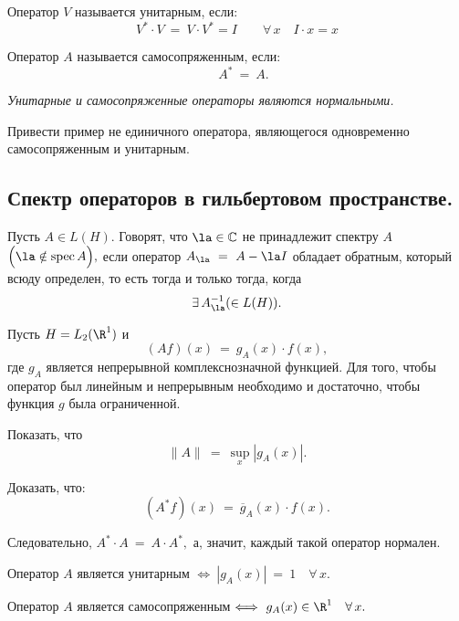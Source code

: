 \documentclass[a4paper]{article}
\newcommand{\mro} {\R^1}
\newcommand{\spec}{\mathop{\mathrm{spec}}\nolimits}
\begin{document}
\begin{df}
Оператор $V$ называется унитарным, если:
$$
V^{*} \cdot V \ = \ V \cdot V^{*} = I \qquad \forall \, x \quad I
\cdot x = x
$$
\end{df}

\begin{df}
Оператор $A$ называется самосопряженным, если:
$$
\quad A^{*}\ = \ A.$$
\end{df}
\emph{Унитарные и самосопряженные операторы являются нормальными.}

\begin{problem}
Привести пример не единичного оператора, являющегося одновременно
самосопряженным и унитарным.
\end{problem}

\subsection{Спектр операторов в гильбертовом пространстве.}

Пусть $A\in L(H).$ Говорят, что $\la\in \mathbb{C}$ не принадлежит
спектру $A$ $\Bigl(\la\notin \spec A\Bigr),$ если оператор
$A_{\la} \ = \ A - \la I$ обладает обратным, который всюду
определен, то есть тогда и только тогда, когда
$$\exists \, A_{\la}^{-1} (\in L(H)).$$

\begin{ex}
Пусть $H = L_2(\mro)$ и
$$
(Af)(x)\ = \ g_{A} (x) \cdot f(x),
$$
где $g_A$ является непрерывной комплекснозначной функцией. Для
того, чтобы оператор был линейным и непрерывным необходимо и
достаточно, чтобы функция $g$ была ограниченной.
\end{ex}

\begin{problem}
Показать, что
$$
\|A\|\ = \ \sup\limits_{x} |g_A (x)|.
$$
\end{problem}

\begin{problem}
Доказать, что:
$$
(A^{*} f)(x)\ = \ \overline{g}_{A} (x) \cdot f(x).
$$
\end{problem}

Следовательно, $A^{*} \cdot A\ = \ A \cdot A^{*},$ а, значит,
каждый такой оператор нормален.

\begin{problem}
Оператор $A$ является унитарным $\Longleftrightarrow \ |g_A (x)|\
= \ 1 \quad \forall \, x.$
\end{problem}

\begin{problem}
Оператор $A$ является самосопряженным $\Longleftrightarrow \ g_A
(x)\in \mro \quad \forall \, x.$
\end{problem}
\end{document}
